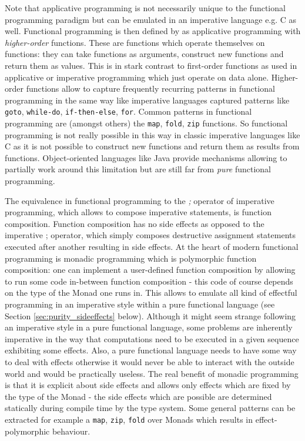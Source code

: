 Note that applicative programming is not necessarily unique to the functional programming paradigm but can be emulated in an imperative language e.g. C as well. Functional programming is then defined by \cite{maclennan_functional_1990} as applicative programming with \textit{higher-order} functions. These are functions which operate themselves on functions: they can take functions as arguments, construct new functions and return them as values. This is in stark contrast to first-order functions as used in applicative or imperative programming which just operate on data alone. Higher-order functions allow to capture frequently recurring patterns in functional programming in the same way like imperative languages captured patterns like \texttt{goto}, \texttt{while-do}, \texttt{if-then-else}, \texttt{for}. Common patterns in functional programming are (amongst others) the \texttt{map}, \texttt{fold}, \texttt{zip} functions. So functional programming is not really possible in this way in classic imperative languages like C as it is not possible to construct new functions and return them as results from functions. Object-oriented languages like Java provide mechanisms allowing to partially work around this limitation but are still far from \textit{pure} functional programming.

The equivalence in functional programming to the \textit{;} operator of imperative programming, which allows to compose imperative statements, is function composition. Function composition has no side effects as opposed to the imperative ; operator, which simply composes destructive assignment statements executed after another resulting in side effects.
At the heart of modern functional programming is monadic programming which is polymorphic function composition: one can implement a user-defined function composition by allowing to run some code in-between function composition - this code of course depends on the type of the Monad one runs in. This allows to emulate all kind of effectful programming in an imperative style within a pure functional language (see Section \ref{sec:purity_sideeffects} below). Although it might seem strange following an imperative style in a pure functional language, some problems are inherently imperative in the way that computations need to be executed in a given sequence exhibiting some effects. Also, a pure functional language needs to have some way to deal with effects otherwise it would never be able to interact with the outside world and would be practically useless. The real benefit of monadic programming is that it is explicit about side effects and allows only effects which are fixed by the type of the Monad - the side effects which are possible are determined statically during compile time by the type system. Some general patterns can be extracted for example a \texttt{map}, \texttt{zip}, \texttt{fold} over Monads which results in effect-polymorphic behaviour. %

